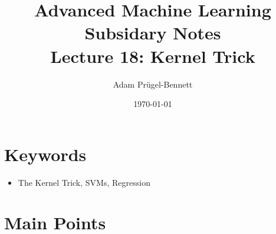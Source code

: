 \documentclass[11pt]{article}
\author{Adam Prügel-Bennett}
\date{\today}
\title{Advanced Machine Learning Subsidary Notes\\\medskip
\large Lecture 18: Kernel Trick}
\begin{document}
\maketitle


\section{Keywords}
\label{sec:orgaeb0d6b}
\begin{itemize}
\item The Kernel Trick, SVMs, Regression
\end{itemize}

\section{Main Points}
\label{sec:org0f10776}
\end{document}
